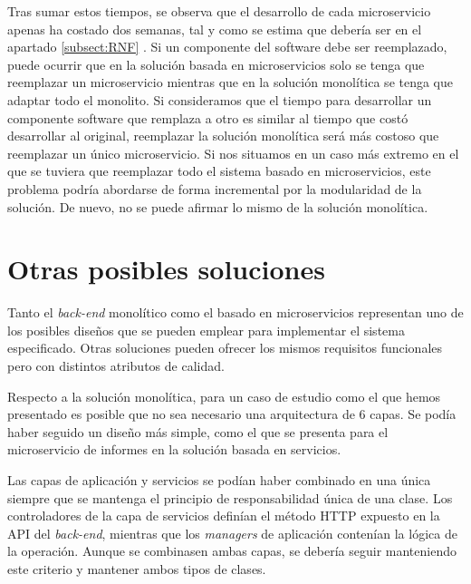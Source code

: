 \documentclass[11pt,spanish,listoffigures]{tfgetsinf}
\begin{document}
Tras sumar estos tiempos, se observa que el desarrollo de cada microservicio apenas ha costado dos semanas, tal y como se estima que debería ser en el apartado \ref{subsect:RNF} . Si un componente del software debe ser reemplazado, puede ocurrir que en la solución basada en microservicios solo se tenga que reemplazar un microservicio mientras que en la solución monolítica se tenga que adaptar todo el monolito. Si consideramos que el tiempo para desarrollar un componente software que remplaza a otro es similar al tiempo que costó desarrollar al original, reemplazar la solución monolítica será más costoso que reemplazar un único microservicio. Si nos situamos en un caso más extremo en el que se tuviera que reemplazar todo el sistema basado en microservicios, este problema podría abordarse de forma incremental por la modularidad de la solución. De nuevo, no se puede afirmar lo mismo de la solución monolítica.

\section{Otras posibles soluciones}

Tanto el \textit{back-end} monolítico como el basado en microservicios representan uno de los posibles diseños que se pueden emplear para implementar el sistema especificado. Otras soluciones pueden ofrecer los mismos requisitos funcionales pero con distintos atributos de calidad.

Respecto a la solución monolítica, para un caso de estudio como el que hemos presentado es posible que no sea necesario una arquitectura de 6 capas. Se podía haber seguido un diseño más simple, como el que se presenta para el microservicio de informes en la solución basada en servicios. 

Las capas de aplicación y servicios se podían haber combinado en una única siempre que se mantenga el principio de responsabilidad única de una clase. Los controladores de la capa de servicios definían el método HTTP expuesto en la API del \textit{back-end}, mientras que los \textit{managers} de aplicación contenían la lógica de la operación. Aunque se combinasen ambas capas, se debería seguir manteniendo este criterio y mantener ambos tipos de clases.
\end{document}
